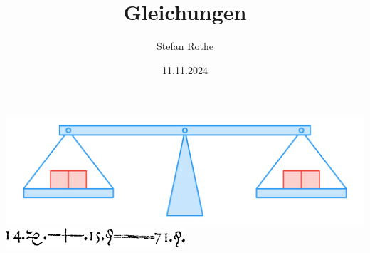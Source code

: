 \documentclass[parskip=half]{scrartcl}
\title{Gleichungen}
\author{Stefan Rothe}
\date{11.11.2024}
\begin{document}
  \maketitle
  \thispagestyle{empty}
  \begin{center}
    \includegraphics[height=4cm]{Waage.pdf}
    \includegraphics[width=0.5\textwidth]{Erste Gleichung.png}
  \end{center}
  \tableofcontents
  \clearpage

  
  
  
  
  
\end{document}
